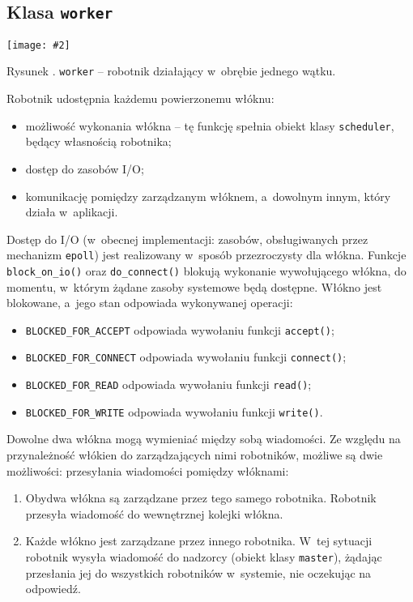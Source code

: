 \documentclass[12pt]{mwart}
\newcommand{\code}{\texttt}
\newcommand{\procbr}{()}
\newcommand{\function}[1]{\code{#1\procbr}}
\newcounter{figmain}
\newcommand{\myownfigure}[4]{ \newcounter{#1} \setcounter{#1}{\value{figmain}} \addtocounter{figmain}{1} \begin{center} \label{fig:#1} \centering \texttt{[image: \#2]}\\ \nopagebreak[5] \parbox[t]{11.5cm}{Rysunek \arabic{#1}. #3.} \end{center}}
\begin{document}
\subsection{Klasa \code{worker}}
\myownfigure{Worker}{Worker.png}{\code{worker} -- robotnik działający w~obrębie jednego wątku}{.7}
\indent
  Robotnik udostępnia każdemu powierzonemu włóknu:
  \begin{itemize}
    \item możliwość wykonania włókna -- tę funkcję spełnia obiekt klasy \code{scheduler}, będący własnością robotnika;
    \item dostęp do zasobów I/O;
    \item komunikację pomiędzy zarządzanym włóknem, a~dowolnym innym, który działa w~aplikacji.
  \end{itemize}
\par
\indent
Dostęp do I/O (w~obecnej implementacji: zasobów, obsługiwanych przez mechanizm \code{epoll}) jest realizowany w~sposób przezroczysty dla włókna. 
  Funkcje \function{block\_on\_io} oraz \function{do\_connect} blokują wykonanie wywołującego włókna, do momentu, w~którym 
  żądane zasoby systemowe będą dostępne. Włókno jest blokowane, a~jego stan odpowiada wykonywanej operacji:
  \begin{itemize}
    \item \code{BLOCKED\_FOR\_ACCEPT} odpowiada wywołaniu funkcji \function{accept};
    \item \code{BLOCKED\_FOR\_CONNECT} odpowiada wywołaniu funkcji \function{connect};
    \item \code{BLOCKED\_FOR\_READ} odpowiada wywołaniu funkcji \function{read};
    \item \code{BLOCKED\_FOR\_WRITE} odpowiada wywołaniu funkcji \function{write}.
  \end{itemize}
\par
\indent
  Dowolne dwa włókna mogą wymieniać między sobą wiadomości. Ze względu na przynależność włókien do zarządzających nimi robotników, możliwe są dwie możliwości:
  przesyłania wiadomości pomiędzy włóknami:
  \begin{enumerate}
    \item Obydwa włókna są zarządzane przez tego samego robotnika. Robotnik przesyła wiadomość do wewnętrznej kolejki włókna.
    \item Każde włókno jest zarządzane przez innego robotnika. W~tej sytuacji robotnik wysyła wiadomość do nadzorcy (obiekt klasy \code{master}), żądając
      przesłania jej do wszystkich robotników w~systemie, nie oczekując na odpowiedź.
  \end{enumerate}
\end{document}
